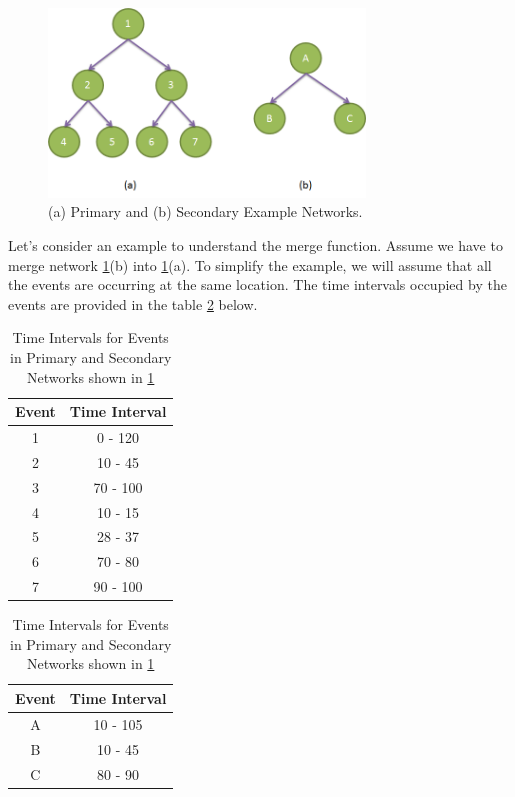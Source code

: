 \begin{figure}[t]
\centering
\includegraphics[width=0.75\textwidth]{media/chapter4/merge-example-setup.png}
\caption{(a) Primary and (b) Secondary Example Networks.}
\label{fig:merge-setup}
\end{figure}

Let's consider an example to understand the merge function. Assume we have to merge network \ref{fig:merge-setup}(b) into \ref{fig:merge-setup}(a). To simplify the example, we will assume that all the events are occurring at the same location. The time intervals occupied by the events are provided in the table \ref{tab:intervals} below.

\begin{table}[h]
\begin{center}
\begin{tabular}{|cc|}
\hline
Event & Time Interval \\
\hline
1 & 0 - 120 \\
2 & 10 - 45 \\
3 & 70 - 100 \\
4 & 10 - 15 \\
5 & 28 - 37 \\
6 & 70 - 80 \\
7 & 90 - 100 \\
\hline
\end{tabular}
\quad
\begin{tabular}{|cc|}
\hline
Event & Time Interval \\
\hline
A & 10 - 105 \\
B & 10 - 45 \\
C & 80 - 90 \\
\hline
\end{tabular}
\end{center}
\caption{Time Intervals for Events in Primary and Secondary Networks shown in \ref{fig:merge-setup}}
\label{tab:intervals}
\end{table}

